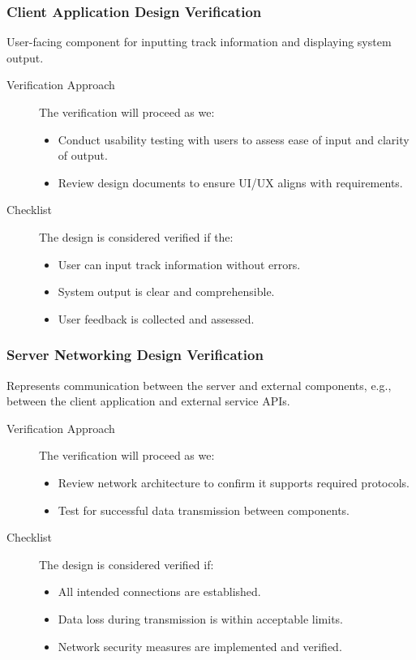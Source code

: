 \documentclass[12pt, titlepage]{article}
\begin{document}
\subsubsection{Client Application Design Verification}
User-facing component for inputting track information and displaying system output.
\begin{description}
  \item[Verification Approach] The verification will proceed as we:
  
  \begin{itemize}[leftmargin=0cm]
    \item Conduct usability testing with users to assess ease of input and clarity of output.
    \item Review design documents to ensure UI/UX aligns with requirements.
  \end{itemize}
  \item[Checklist] The design is considered verified if the:
  
    \begin{itemize}[label=$\square$,leftmargin=0cm]
    \item User can input track information without errors.
    \item System output is clear and comprehensible.
    \item User feedback is collected and assessed.
  \end{itemize}
\end{description}

\subsubsection{Server Networking Design Verification}
Represents communication between the server and external components, e.g., between the client application and external service APIs.
\begin{description}
  \item[Verification Approach] The verification will proceed as we:
  \begin{itemize}[leftmargin=0cm]
    \item Review network architecture to confirm it supports required protocols.
    \item Test for successful data transmission between components.
  \end{itemize}
  \item[Checklist] The design is considered verified if:
    \begin{itemize}[label=$\square$,leftmargin=0cm]
    \item All intended connections are established.
    \item Data loss during transmission is within acceptable limits.
    \item Network security measures are implemented and verified.
  \end{itemize}
\end{description}
\end{document}
